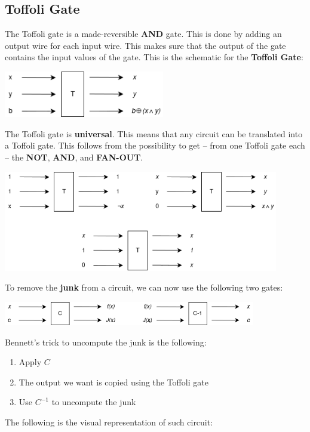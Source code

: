 \documentclass{article}
\begin{document}
\subsection{Toffoli Gate}
The Toffoli gate is a made-reversible \textbf{AND} gate. This is done by adding an output wire for each input wire. This makes sure that the output of the gate contains the input values of the gate. This is the schematic for the \textbf{Toffoli Gate}:

\begin{center}
	\includegraphics[width=7cm]{assets/toffoli.png}
\end{center}
The Toffoli gate is \textbf{universal}. This means that any circuit can be translated into a Toffoli gate. This follows from the possibility to get -- from one Toffoli gate each -- the \textbf{NOT}, \textbf{AND}, and \textbf{FAN-OUT}.

\begin{center}
	\includegraphics[width=12cm]{assets/not_and_fanout.png}
\end{center}
To remove the \textbf{junk} from a circuit, we can now use the following two gates:

\begin{center}
	\includegraphics[width=11cm]{assets/junk.png}
\end{center}
Bennett's trick to uncompute the junk is the following:

\begin{enumerate}
	\item Apply $C$
	\item The output we want is copied using the Toffoli gate
	\item Use $C^{-1}$ to uncompute the junk
\end{enumerate}
The following is the visual representation of such circuit:
\end{document}
